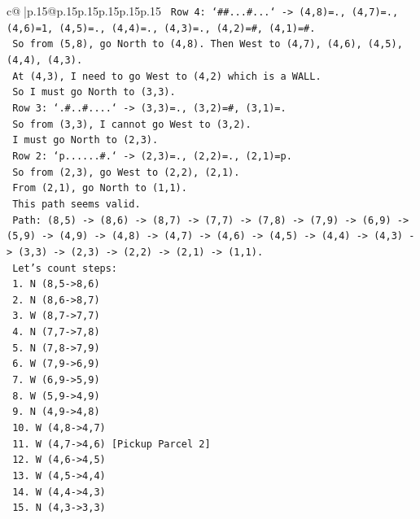 \documentclass{article}
\begin{document}
{\begin{supertabular}{c@{$\;$}|p{.15\linewidth}@{}p{.15\linewidth}p{.15\linewidth}p{.15\linewidth}p{.15\linewidth}p{.15\linewidth}}
{{{\texttt{   Row 4: `\#\#...\#...` {-}> (4,8)=., (4,7)=., (4,6)=1, (4,5)=., (4,4)=., (4,3)=., (4,2)=\#, (4,1)=\#.} \\
\texttt{   So from (5,8), go North to (4,8). Then West to (4,7), (4,6), (4,5), (4,4), (4,3).} \\
\texttt{   At (4,3), I need to go West to (4,2) which is a WALL.} \\
\texttt{   So I must go North to (3,3).} \\
\texttt{   Row 3: `.\#..\#....` {-}> (3,3)=., (3,2)=\#, (3,1)=.} \\
\texttt{   So from (3,3), I cannot go West to (3,2).} \\
\texttt{   I must go North to (2,3).} \\
\texttt{   Row 2: `p......\#.` {-}> (2,3)=., (2,2)=., (2,1)=p.} \\
\texttt{   So from (2,3), go West to (2,2), (2,1).} \\
\texttt{   From (2,1), go North to (1,1).} \\
\texttt{   This path seems valid.} \\
\texttt{   Path: (8,5) {-}> (8,6) {-}> (8,7) {-}> (7,7) {-}> (7,8) {-}> (7,9) {-}> (6,9) {-}> (5,9) {-}> (4,9) {-}> (4,8) {-}> (4,7) {-}> (4,6) {-}> (4,5) {-}> (4,4) {-}> (4,3) {-}> (3,3) {-}> (2,3) {-}> (2,2) {-}> (2,1) {-}> (1,1).} \\
\texttt{   Let's count steps:} \\
\texttt{   1. N (8,5{-}>8,6)} \\
\texttt{   2. N (8,6{-}>8,7)} \\
\texttt{   3. W (8,7{-}>7,7)} \\
\texttt{   4. N (7,7{-}>7,8)} \\
\texttt{   5. N (7,8{-}>7,9)} \\
\texttt{   6. W (7,9{-}>6,9)} \\
\texttt{   7. W (6,9{-}>5,9)} \\
\texttt{   8. W (5,9{-}>4,9)} \\
\texttt{   9. N (4,9{-}>4,8)} \\
\texttt{   10. W (4,8{-}>4,7)} \\
\texttt{   11. W (4,7{-}>4,6) {[}Pickup Parcel 2{]}} \\
\texttt{   12. W (4,6{-}>4,5)} \\
\texttt{   13. W (4,5{-}>4,4)} \\
\texttt{   14. W (4,4{-}>4,3)} \\
\texttt{   15. N (4,3{-}>3,3)} \\
}}}
\end{supertabular}}
\end{document}
